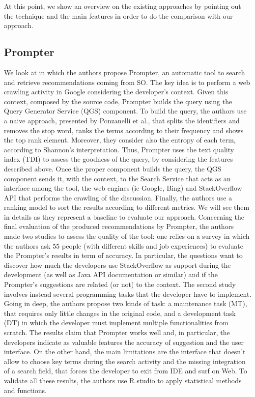 At this point, we show an overview on the existing approaches by pointing out the technique and the main features in order to do the comparison with our approach. 

\subsection{Prompter}
We look at \cite{DBLP:journals/ese/PonzanelliBPOL16} in which the authors propose Prompter, an automatic tool to search and retrieve recommendations coming from SO. The key idea is to perform a web crawling activity in Google considering the developer's context. Given this context, composed by the source code, Prompter builds the query using the Query Generator Service (QGS) component. 
 To build the query, the authors use a naive approach, presented by Ponzanelli et al., that splits the identifiers and removes the stop word, ranks the terms according to their frequency and shows the top rank element. Moreover, they consider also the entropy of each term, according to Shannon's interpretation. Thus, Prompter uses the text quality index (TDI) to assess the goodness of the query, by considering the features described above. Once the proper component builds the query,  the QGS component sends it, with the context, to the Search Service that acts as an interface among the tool, the web engines (ie Google, Bing) and StackOverflow API that performs the crawling of the discussion. Finally, the authors use a ranking model to sort the results according to different metrics. We will see them in details as they represent a baseline to evaluate our approach. 
Concerning the final evaluation of the produced recommendations by Prompter, the authors made two studies to assess the quality of the tool: one relies on a survey in which the authors ask 55 people (with different skills and job experiences) to evaluate the Prompter's results in term of accuracy. In particular, the questions want to discover how much the developers use StackOverflow as support during the development (as well as Java API documentation or similar) and if the Prompter's suggestions are related (or not) to the context. 
The second study involves instead several programming tasks that the developer have to implement. Going in deep, the authors propose two kinds of task: a maintenance task (MT), that requires only little changes in the original code, and a development task (DT) in which the developer must implement multiple functionalities from scratch. The results claim that Prompter works well and, in particular, the developers indicate as valuable features the accuracy of suggestion and the user interface. On the other hand, the main limitations are the interface that doesn't allow to choose key terms during the search activity and the missing integration of a  search field, that forces the developer to exit from IDE and surf on Web. To validate all these results, the authors use R studio to apply statistical methods and functions. 


